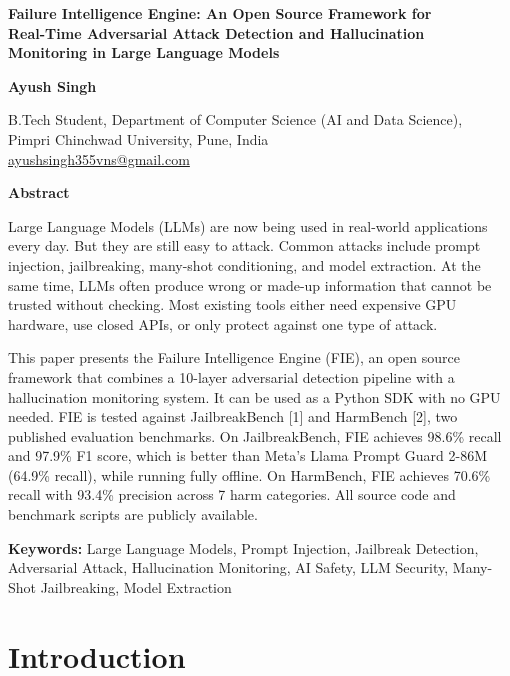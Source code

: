 \documentclass[12pt,a4paper]{article}
\begin{document}
\begin{center}
{\fontsize{24}{28}\bfseries
Failure Intelligence Engine: An Open Source Framework for\\
Real-Time Adversarial Attack Detection and Hallucination\\
Monitoring in Large Language Models}

\vspace{10pt}
{\fontsize{16}{20}\bfseries Ayush Singh}

\vspace{4pt}
{\small B.Tech Student, Department of Computer Science (AI and Data Science),\\
Pimpri Chinchwad University, Pune, India}\\
{\small \href{mailto:ayushsingh355vns@gmail.com}{ayushsingh355vns@gmail.com}}
\end{center}

\vspace{10pt}

\textbf{Abstract}

Large Language Models (LLMs) are now being used in real-world applications
every day. But they are still easy to attack. Common attacks include prompt
injection, jailbreaking, many-shot conditioning, and model extraction.
At the same time, LLMs often produce wrong or made-up information that cannot
be trusted without checking. Most existing tools either need expensive GPU
hardware, use closed APIs, or only protect against one type of attack.

This paper presents the Failure Intelligence Engine (FIE), an open source
framework that combines a 10-layer adversarial detection pipeline with a
hallucination monitoring system. It can be used as a Python SDK with no GPU
needed. FIE is tested against JailbreakBench [1] and HarmBench [2], two
published evaluation benchmarks. On JailbreakBench, FIE achieves 98.6\%
recall and 97.9\% F1 score, which is better than Meta's Llama Prompt Guard
2-86M (64.9\% recall), while running fully offline. On HarmBench, FIE
achieves 70.6\% recall with 93.4\% precision across 7 harm categories.
All source code and benchmark scripts are publicly available.

\textbf{Keywords:} Large Language Models, Prompt Injection, Jailbreak Detection,
Adversarial Attack, Hallucination Monitoring, AI Safety, LLM Security,
Many-Shot Jailbreaking, Model Extraction

\section{Introduction}
\end{document}
